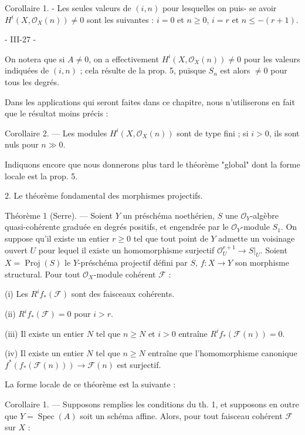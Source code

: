 Corollaire 1. - Les seules valeurs de $(i, n)$ pour lesquelles on puis-
se avoir $H^i(X, \mathcal{O}_X(n)) \neq 0$ sont les suivantes : $i=0$ et $n \ge 0$, $i=r$ et
$n \le -(r+1)$.

\newpage


- III-27 -

On notera que si $A \neq 0$, on a effectivement $H^i(X, \mathcal{O}_X(n)) \neq 0$ pour les valeurs indiquées de $(i,n)$ ; cela résulte de la prop. 5, puisque $S_n$ est alors $\neq 0$ pour tous les degrés.

Dans les applications qui seront faites dans ce chapitre, nous n'utiliserons en fait que le résultat moins précis :

Corollaire 2. — Les modules $H^i(X, \mathcal{O}_X(n))$ sont de type fini ; si $i > 0$, ils sont nuls pour $n \gg 0$.

Indiquons encore que nous donnerons plus tard le théorème "global" dont la forme locale est la prop. 5.

2. Le théorème fondamental des morphismes projectifs.

Théorème 1 (Serre). — Soient $Y$ un préschéma noethérien, $S$ une $\mathcal{O}_Y$-algèbre quasi-cohérente graduée en degrés positifs, et engendrée par le $\mathcal{O}_Y$-module $S_1$. On suppose qu'il existe un entier $r \ge 0$ tel que tout point de $Y$ admette un voisinage ouvert $U$ pour lequel il existe un homomorphisme surjectif $\mathcal{O}_U^{r+1} \to S|_U$. Soient $X = \operatorname{Proj}(S)$ le $Y$-préschéma projectif défini par $S$, $f : X \to Y$ son morphisme structural. Pour tout $\mathcal{O}_X$-module cohérent $\mathcal{F}$ :

(i) Les $R^i f_* (\mathcal{F})$ sont des faisceaux cohérents.

(ii) $R^i f_* (\mathcal{F}) = 0$ pour $i > r$.

(iii) Il existe un entier $N$ tel que $n \ge N$ et $i > 0$ entraîne $R^i f_* (\mathcal{F}(n)) = 0$.

(iv) Il existe un entier $N$ tel que $n \ge N$ entraîne que l'homomorphisme canonique $f^* (f_* (\mathcal{F}(n))) \to \mathcal{F}(n)$ est surjectif.

La forme locale de ce théorème est la suivante :

Corollaire 1. — Supposons remplies les conditions du th. 1, et supposons en outre que $Y = \operatorname{Spec}(A)$ soit un schéma affine. Alors, pour tout faisceau cohérent $\mathcal{F}$ sur $X$ :

